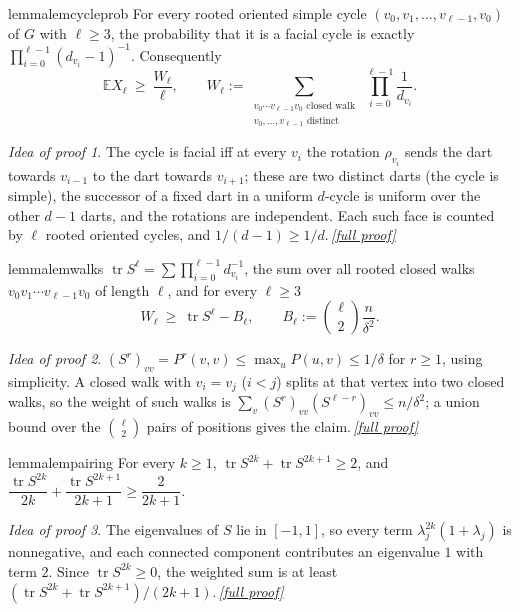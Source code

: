 \documentclass[11pt,a4paper]{article}
\theoremstyle{plain}
\theoremstyle{definition}
\theoremstyle{remark}
\newtheorem*{proofidea}{Idea of proof}
\newcommand{\fullproofref}[1]{\,\hyperref[#1]{\textit{[full proof]}}}
\newcommand{\E}{\mathbb E}
\DeclareMathOperator{\tr}{tr}
\begin{document}
\begin{restatable}{lemma}{lemcycleprob}\label{lem:cycleprob}
For every rooted oriented simple cycle $(v_0,v_1,\dots,v_{\ell-1},v_0)$ of $G$ with $\ell\ge3$, the probability that it is a facial cycle is exactly $\prod_{i=0}^{\ell-1}(d_{v_i}-1)^{-1}$. Consequently
\[
 \E X_\ell\ \ge\ \frac{W_\ell}{\ell},\qquad W_\ell:=\sum_{\substack{v_0\cdots v_{\ell-1}v_0\text{ closed walk}\\ v_0,\dots,v_{\ell-1}\text{ distinct}}}\ \prod_{i=0}^{\ell-1}\frac1{d_{v_i}}.
\]
\end{restatable}
\begin{proofidea}
The cycle is facial iff at every $v_i$ the rotation $\rho_{v_i}$ sends the dart towards $v_{i-1}$ to the dart towards $v_{i+1}$; these are two distinct darts (the cycle is simple), the successor of a fixed dart in a uniform $d$-cycle is uniform over the other $d-1$ darts, and the rotations are independent. Each such face is counted by $\ell$ rooted oriented cycles, and $1/(d-1)\ge1/d$.\fullproofref{pf:cycleprob}
\end{proofidea}

\begin{restatable}{lemma}{lemwalks}\label{lem:walks}
$\tr S^\ell=\sum\prod_{i=0}^{\ell-1}d_{v_i}^{-1}$, the sum over all rooted closed walks $v_0v_1\cdots v_{\ell-1}v_0$ of length $\ell$, and for every $\ell\ge3$
\[
 W_\ell\ \ge\ \tr S^\ell-B_\ell,\qquad B_\ell:=\binom\ell2\frac n{\delta^2}.
\]
\end{restatable}
\begin{proofidea}
$(S^r)_{vv}=P^r(v,v)\le\max_uP(u,v)\le1/\delta$ for $r\ge1$, using simplicity. A closed walk with $v_i=v_j$ ($i<j$) splits at that vertex into two closed walks, so the weight of such walks is $\sum_v(S^r)_{vv}(S^{\ell-r})_{vv}\le n/\delta^2$; a union bound over the $\binom\ell2$ pairs of positions gives the claim.\fullproofref{pf:walks}
\end{proofidea}

\begin{restatable}{lemma}{lempairing}\label{lem:pairing}
For every $k\ge1$, $\tr S^{2k}+\tr S^{2k+1}\ge2$, and $\dfrac{\tr S^{2k}}{2k}+\dfrac{\tr S^{2k+1}}{2k+1}\ge\dfrac2{2k+1}$.
\end{restatable}
\begin{proofidea}
The eigenvalues of $S$ lie in $[-1,1]$, so every term $\lambda_j^{2k}(1+\lambda_j)$ is nonnegative, and each connected component contributes an eigenvalue $1$ with term $2$. Since $\tr S^{2k}\ge0$, the weighted sum is at least $(\tr S^{2k}+\tr S^{2k+1})/(2k+1)$.\fullproofref{pf:pairing}
\end{proofidea}
\end{document}

